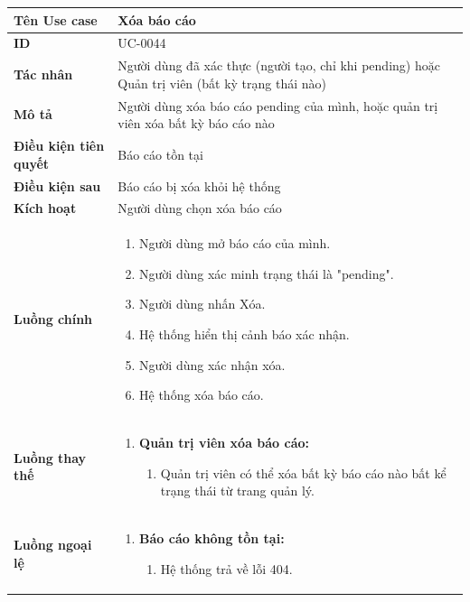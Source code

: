 {
\renewcommand{\arraystretch}{1.5}

\begin{tabularx}{\textwidth}{|>{\raggedright\arraybackslash}X|>{\raggedright\arraybackslash}X|}
\hline
\textbf{Tên Use case} & Xóa báo cáo \\
\hline
\textbf{ID} & UC-0044 \\
\hline
\textbf{Tác nhân} & Người dùng đã xác thực (người tạo, chỉ khi pending) hoặc Quản trị viên (bất kỳ trạng thái nào) \\
\hline
\textbf{Mô tả} & Người dùng xóa báo cáo pending của mình, hoặc quản trị viên xóa bất kỳ báo cáo nào \\
\hline
\textbf{Điều kiện tiên quyết} & Báo cáo tồn tại \\
\hline
\textbf{Điều kiện sau} & Báo cáo bị xóa khỏi hệ thống \\
\hline
\textbf{Kích hoạt} & Người dùng chọn xóa báo cáo \\
\hline
\textbf{Luồng chính} &
\begin{enumerate}
    \item Người dùng mở báo cáo của mình.
    \item Người dùng xác minh trạng thái là "pending".
    \item Người dùng nhấn Xóa.
    \item Hệ thống hiển thị cảnh báo xác nhận.
    \item Người dùng xác nhận xóa.
    \item Hệ thống xóa báo cáo.
\end{enumerate} \\
\hline
\textbf{Luồng thay thế} &
\begin{enumerate}
    \item \textbf{Quản trị viên xóa báo cáo:}
    \begin{enumerate}
        \item[1A.] Quản trị viên có thể xóa bất kỳ báo cáo nào bất kể trạng thái từ trang quản lý.
    \end{enumerate}
\end{enumerate} \\
\hline
\textbf{Luồng ngoại lệ} &
\begin{enumerate}
    \item \textbf{Báo cáo không tồn tại:}
    \begin{enumerate}
        \item[1Err.] Hệ thống trả về lỗi 404.
    \end{enumerate}

\end{enumerate}
\end{tabularx}}

